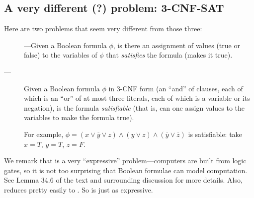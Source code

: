 \documentclass[11pt]{article}
\begin{document}
\subsection{A very different (?) problem: 3-CNF-SAT}
Here are two problems that seem very different from those three:

\begin{description}

\item[]---Given a Boolean formula $\phi$,
  is there an assignment of values (true or false) to the variables of $\phi$
  that \emph{satisfies} the formula (makes it true).

\item[---] Given a Boolean formula $\phi$ in 3-CNF form (an ``and'' of clauses,
  each of which is an ``or'' of at most three literals, each of which is a variable or its negation),
  is the formula \emph{satisfiable} (that is, can one assign values to the variables to make the 
  formula true).  
  
  For example, 
  $\phi= (x \vee \overline y \vee z) \wedge (y \vee  z) \wedge (\overline y \vee \overline z)$
  is satisfiable: take $x=T$, $y=T$, $z=F$.
\end{description}

We remark that  is a very ``expressive'' problem---computers are built from logic gates,
so it is not too surprising that Boolean formulae can model computation.
See Lemma 34.6 of the text \CLRS and surrounding discussion for more details.
Also,  reduces pretty easily to .
So  is just as expressive.
\end{document}
